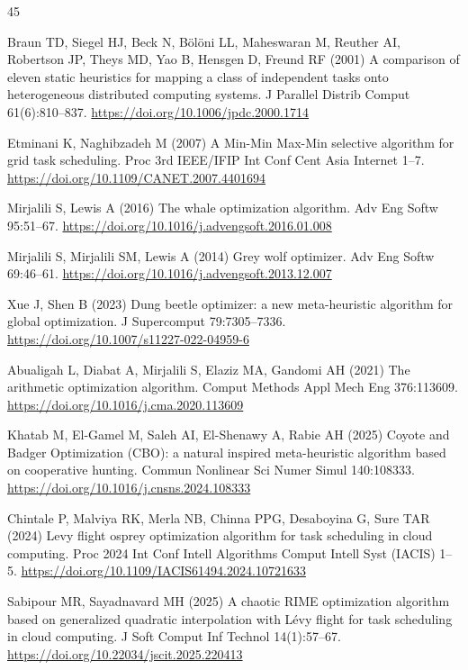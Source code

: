 \documentclass[pdflatex,onecolumn,sn-mathphys-num]{sn-jnl}
\begin{document}
\begin{thebibliography}{45}

Braun TD, Siegel HJ, Beck N, B\"{o}l\"{o}ni LL, Maheswaran M, Reuther AI, Robertson JP, Theys MD, Yao B, Hensgen D, Freund RF (2001) A comparison of eleven static heuristics for mapping a class of independent tasks onto heterogeneous distributed computing systems. J Parallel Distrib Comput 61(6):810--837. \url{https://doi.org/10.1006/jpdc.2000.1714}

Etminani K, Naghibzadeh M (2007) A Min-Min Max-Min selective algorithm for grid task scheduling. Proc 3rd IEEE/IFIP Int Conf Cent Asia Internet 1--7. \url{https://doi.org/10.1109/CANET.2007.4401694}

Mirjalili S, Lewis A (2016) The whale optimization algorithm. Adv Eng Softw 95:51--67. \url{https://doi.org/10.1016/j.advengsoft.2016.01.008}

Mirjalili S, Mirjalili SM, Lewis A (2014) Grey wolf optimizer. Adv Eng Softw 69:46--61. \url{https://doi.org/10.1016/j.advengsoft.2013.12.007}

Xue J, Shen B (2023) Dung beetle optimizer: a new meta-heuristic algorithm for global optimization. J Supercomput 79:7305--7336. \url{https://doi.org/10.1007/s11227-022-04959-6}

Abualigah L, Diabat A, Mirjalili S, Elaziz MA, Gandomi AH (2021) The arithmetic optimization algorithm. Comput Methods Appl Mech Eng 376:113609. \url{https://doi.org/10.1016/j.cma.2020.113609}

Khatab M, El-Gamel M, Saleh AI, El-Shenawy A, Rabie AH (2025) Coyote and Badger Optimization (CBO): a natural inspired meta-heuristic algorithm based on cooperative hunting. Commun Nonlinear Sci Numer Simul 140:108333. \url{https://doi.org/10.1016/j.cnsns.2024.108333}

Chintale P, Malviya RK, Merla NB, Chinna PPG, Desaboyina G, Sure TAR (2024) Levy flight osprey optimization algorithm for task scheduling in cloud computing. Proc 2024 Int Conf Intell Algorithms Comput Intell Syst (IACIS) 1--5. \url{https://doi.org/10.1109/IACIS61494.2024.10721633}

Sabipour MR, Sayadnavard MH (2025) A chaotic RIME optimization algorithm based on generalized quadratic interpolation with L\'{e}vy flight for task scheduling in cloud computing. J Soft Comput Inf Technol 14(1):57--67. \url{https://doi.org/10.22034/jscit.2025.220413}


\end{thebibliography}
\end{document}
